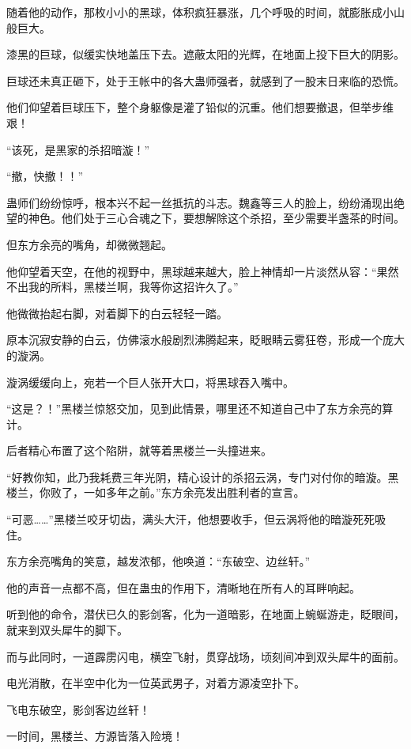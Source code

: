\begin{this_body}
随着他的动作，那枚小小的黑球，体积疯狂暴涨，几个呼吸的时间，就膨胀成小山般巨大。

漆黑的巨球，似缓实快地盖压下去。遮蔽太阳的光辉，在地面上投下巨大的阴影。

巨球还未真正砸下，处于王帐中的各大蛊师强者，就感到了一股末日来临的恐慌。

他们仰望着巨球压下，整个身躯像是灌了铅似的沉重。他们想要撤退，但举步维艰！

“该死，是黑家的杀招暗漩！”

“撤，快撤！！”

蛊师们纷纷惊呼，根本兴不起一丝抵抗的斗志。魏鑫等三人的脸上，纷纷涌现出绝望的神色。他们处于三心合魂之下，要想解除这个杀招，至少需要半盏茶的时间。

但东方余亮的嘴角，却微微翘起。

他仰望着天空，在他的视野中，黑球越来越大，脸上神情却一片淡然从容：“果然不出我的所料，黑楼兰啊，我等你这招许久了。”

他微微抬起右脚，对着脚下的白云轻轻一踏。

原本沉寂安静的白云，仿佛滚水般剧烈沸腾起来，眨眼睛云雾狂卷，形成一个庞大的漩涡。

漩涡缓缓向上，宛若一个巨人张开大口，将黑球吞入嘴中。

“这是？！”黑楼兰惊怒交加，见到此情景，哪里还不知道自己中了东方余亮的算计。

后者精心布置了这个陷阱，就等着黑楼兰一头撞进来。

“好教你知，此乃我耗费三年光阴，精心设计的杀招云涡，专门对付你的暗漩。黑楼兰，你败了，一如多年之前。”东方余亮发出胜利者的宣言。

“可恶……”黑楼兰咬牙切齿，满头大汗，他想要收手，但云涡将他的暗漩死死吸住。

东方余亮嘴角的笑意，越发浓郁，他唤道：“东破空、边丝轩。”

他的声音一点都不高，但在蛊虫的作用下，清晰地在所有人的耳畔响起。

听到他的命令，潜伏已久的影剑客，化为一道暗影，在地面上蜿蜒游走，眨眼间，就来到双头犀牛的脚下。

而与此同时，一道霹雳闪电，横空飞射，贯穿战场，顷刻间冲到双头犀牛的面前。

电光消散，在半空中化为一位英武男子，对着方源凌空扑下。

飞电东破空，影剑客边丝轩！

一时间，黑楼兰、方源皆落入险境！

\end{this_body}

